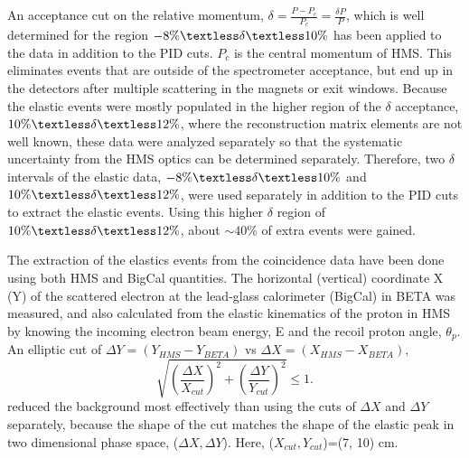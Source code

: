 \documentclass[12pt]{article}
\begin{document}
An acceptance cut on the relative momentum, $\delta = \frac{P-P_c}{P_c}=\frac{\delta P}{P}$, which is well determined for the region $-8\%\textless \delta \textless 10\%$ has been applied to the data in addition to the PID cuts. $P_c$ is the central momentum of HMS. This eliminates events that are outside of the spectrometer acceptance, but end up in the detectors after multiple scattering in the magnets or exit windows. Because the elastic events were mostly populated in the higher region of the $\delta$ acceptance, $10\% \textless \delta \textless 12\%$, where the reconstruction matrix elements are not well known, these data were analyzed separately so that the systematic uncertainty from the HMS optics can be determined separately. Therefore, two $\delta$ intervals of the elastic data, $-8\% \textless \delta \textless 10\%$ and $10\% \textless \delta \textless 12\%$, were used separately in addition to the PID cuts to extract the elastic events.  Using this higher $\delta$ region of $10\% \textless \delta \textless 12\%$, about $\sim40\%$ of extra events were gained. 


The extraction of the elastics events from the coincidence data have been done using both HMS and BigCal quantities. 
The horizontal (vertical) coordinate X (Y) of the scattered electron at the lead-glass calorimeter (BigCal) in BETA was measured, and also calculated from the elastic kinematics of the proton in HMS by knowing the incoming electron beam energy, E and the recoil proton angle, $\theta_p$. An elliptic cut of $\Delta Y = (Y_{HMS}-Y_{BETA})$ vs $\Delta X = (X_{HMS}-X_{BETA})$,
\[
\sqrt{\left(\frac{\Delta X}{X_{cut}}\right)^2+\left(\frac{\Delta Y}{Y_{cut}}\right)^2} \le 1. \]
reduced the background most effectively than using the cuts of $\Delta X$ and $\Delta Y$ separately, because the shape of the cut matches the shape of the elastic peak in two dimensional phase space, ($\Delta X, \Delta Y$). Here, ($X_{cut}, Y_{cut}$)=(7, 10) cm.
\end{document}
